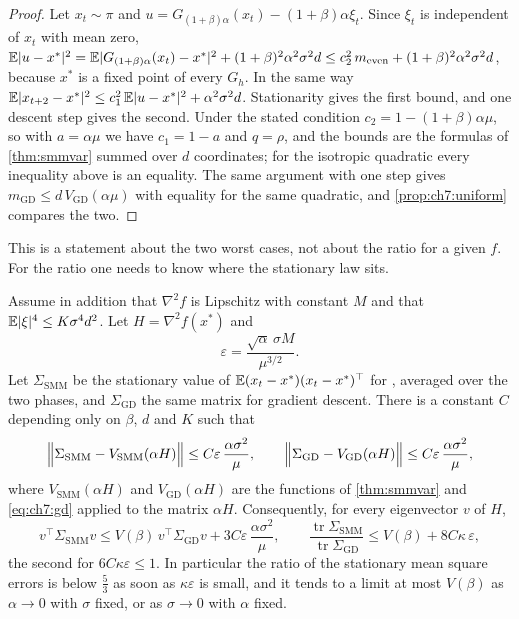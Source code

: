 \begin{proof}
Let $x_t\sim\pi$ and $u=G_{(1+\beta)\alpha}(x_t)-(1+\beta)\alpha\xi_t$. Since $\xi_t$ is independent of $x_t$ with mean zero, $\mathbb{E}|u-x^\ast|^2=\mathbb{E}|G_{(1+\beta)\alpha}(x_t)-x^\ast|^2+(1+\beta)^2\alpha^2\sigma^2d\le c_2^2\,m_{\mathrm{even}}+(1+\beta)^2\alpha^2\sigma^2d$, because $x^\ast$ is a fixed point of every $G_h$. In the same way $\mathbb{E}|x_{t+2}-x^\ast|^2\le c_1^2\,\mathbb{E}|u-x^\ast|^2+\alpha^2\sigma^2d$. Stationarity gives the first bound, and one descent step gives the second. Under the stated condition $c_2=1-(1+\beta)\alpha\mu$, so with $a=\alpha\mu$ we have $c_1=1-a$ and $q=\rho$, and the bounds are the formulas of \cref{thm:smmvar} summed over $d$ coordinates; for the isotropic quadratic every inequality above is an equality. The same argument with one step gives $m_{\mathrm{GD}}\le d\,V_{\mathrm{GD}}(\alpha\mu)$ with equality for the same quadratic, and \cref{prop:ch7:uniform} compares the two.
\end{proof}

This is a statement about the two worst cases, not about the ratio for a given $f$. For the ratio one needs to know where the stationary law sits.

\begin{theorem}\label{thm:ch7:local}
Assume in addition that $\nabla^2f$ is Lipschitz with constant $M$ and that $\mathbb{E}|\xi|^4\le K\sigma^4d^2$. Let $H=\nabla^2f(x^\ast)$ and
\[
  \varepsilon=\frac{\sqrt\alpha\,\sigma M}{\mu^{3/2}} .
\]
Let $\Sigma_{\mathrm{SMM}}$ be the stationary value of $\mathbb{E}(x_t-x^\ast)(x_t-x^\ast)^\top$ for \smmdet, averaged over the two phases, and $\Sigma_{\mathrm{GD}}$ the same matrix for gradient descent. There is a constant $C$ depending only on $\beta$, $d$ and $K$ such that
\[
  \Bigl\|\Sigma_{\mathrm{SMM}}-V_{\mathrm{SMM}}(\alpha H)\Bigr\|\le C\varepsilon\,\frac{\alpha\sigma^2}{\mu},\qquad
  \Bigl\|\Sigma_{\mathrm{GD}}-V_{\mathrm{GD}}(\alpha H)\Bigr\|\le C\varepsilon\,\frac{\alpha\sigma^2}{\mu},
\]
where $V_{\mathrm{SMM}}(\alpha H)$ and $V_{\mathrm{GD}}(\alpha H)$ are the functions of \cref{thm:smmvar} and \eqref{eq:ch7:gd} applied to the matrix $\alpha H$. Consequently, for every eigenvector $v$ of $H$,
\[
  v^\top\Sigma_{\mathrm{SMM}}v\le V(\beta)\,v^\top\Sigma_{\mathrm{GD}}v+3C\varepsilon\,\frac{\alpha\sigma^2}{\mu},
  \qquad
  \frac{\operatorname{tr}\Sigma_{\mathrm{SMM}}}{\operatorname{tr}\Sigma_{\mathrm{GD}}}\le V(\beta)+8C\kappa\,\varepsilon ,
\]
the second for $6C\kappa\varepsilon\le1$. In particular the ratio of the stationary mean square errors is below $\tfrac53$ as soon as $\kappa\varepsilon$ is small, and it tends to a limit at most $V(\beta)$ as $\alpha\to0$ with $\sigma$ fixed, or as $\sigma\to0$ with $\alpha$ fixed.
\end{theorem}

